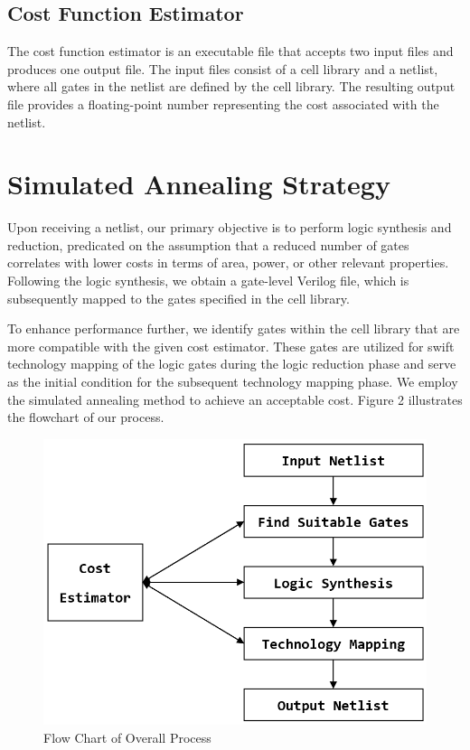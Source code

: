 \documentclass[conference]{IEEEtran}
\begin{document}
\subsection{Cost Function Estimator}

The cost function estimator is an executable file that accepts two input files and produces one output file. The input files consist of a cell library and a netlist, where all gates in the netlist are defined by the cell library. The resulting output file provides a floating-point number representing the cost associated with the netlist.

\section{Simulated Annealing Strategy}

Upon receiving a netlist, our primary objective is to perform logic synthesis and reduction, predicated on the assumption that a reduced number of gates correlates with lower costs in terms of area, power, or other relevant properties. Following the logic synthesis, we obtain a gate-level Verilog file, which is subsequently mapped to the gates specified in the cell library.

To enhance performance further, we identify gates within the cell library that are more compatible with the given cost estimator. These gates are utilized for swift technology mapping of the logic gates during the logic reduction phase and serve as the initial condition for the subsequent technology mapping phase. We employ the simulated annealing method to achieve an acceptable cost. Figure 2 illustrates the flowchart of our process.

\begin{figure}
    \centering
    \includegraphics[width=1\linewidth]{flow chart.png}
    \caption{Flow Chart of Overall Process}
    \label{fig:enter-label}
\end{figure}
\end{document}
